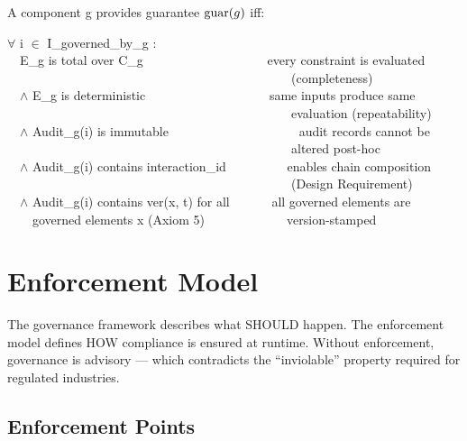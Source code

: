 \begin{cdef}
A component g provides guarantee $\operatorname{guar}(g)$ iff:

\begin{cladnote}
$\forall$ i $\in$ I\_governed\_by\_g :\\
~~E\_g is total over C\_g~~~~~~~~~~~~~~~~~~~\textemdash{} every constraint is evaluated\\
~~~~~~~~~~~~~~~~~~~~~~~~~~~~~~~~~~~~~~~~~~~~~(completeness)\\
~~$\wedge$ E\_g is deterministic~~~~~~~~~~~~~~~~~~~\textemdash{} same inputs produce same\\
~~~~~~~~~~~~~~~~~~~~~~~~~~~~~~~~~~~~~~~~~~~~~evaluation (repeatability)\\
~~$\wedge$ Audit\_g(i) is immutable~~~~~~~~~~~~~~~~~~~~\textemdash{} audit records cannot be\\
~~~~~~~~~~~~~~~~~~~~~~~~~~~~~~~~~~~~~~~~~~~~~altered post-hoc\\
~~$\wedge$ Audit\_g(i) contains interaction\_id~~~~~~~~~\textemdash{} enables chain composition\\
~~~~~~~~~~~~~~~~~~~~~~~~~~~~~~~~~~~~~~~~~~~~~(Design Requirement)\\
~~$\wedge$ Audit\_g(i) contains ver(x, t) for all~~~~~~\textemdash{} all governed elements are\\
~~~~governed elements x (Axiom 5)~~~~~~~~~~~~~version-stamped\\
\end{cladnote}
\end{cdef}


\section{Enforcement Model}
\label{sec:framework-6}


The governance framework describes what SHOULD happen. The enforcement model defines HOW compliance is ensured at runtime. Without enforcement, governance is advisory --- which contradicts the ``inviolable'' property required for regulated industries.

\subsection{Enforcement Points}


